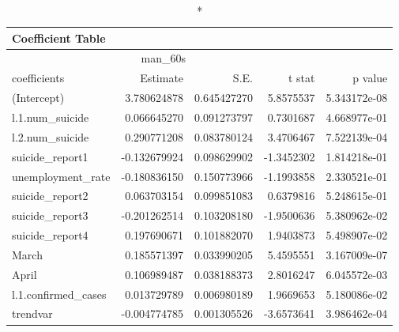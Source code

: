 \begin{longtable}{lrrrr}
\caption*{
{\large Coefficient Table}
} \\ 
\toprule
\multicolumn{4}{c}{man\_60s} &  \\ 
\cmidrule(lr){1-4}
coefficients & Estimate & S.E. & t stat & p value \\ 
\midrule\addlinespace[2.5pt]
(Intercept) & 3.780624878 & 0.645427270 & 5.8575537 & 5.343172e-08 \\ 
l.1.num\_suicide & 0.066645270 & 0.091273797 & 0.7301687 & 4.668977e-01 \\ 
l.2.num\_suicide & 0.290771208 & 0.083780124 & 3.4706467 & 7.522139e-04 \\ 
suicide\_report1 & -0.132679924 & 0.098629902 & -1.3452302 & 1.814218e-01 \\ 
unemployment\_rate & -0.180836150 & 0.150773966 & -1.1993858 & 2.330521e-01 \\ 
suicide\_report2 & 0.063703154 & 0.099851083 & 0.6379816 & 5.248615e-01 \\ 
suicide\_report3 & -0.201262514 & 0.103208180 & -1.9500636 & 5.380962e-02 \\ 
suicide\_report4 & 0.197690671 & 0.101882070 & 1.9403873 & 5.498907e-02 \\ 
March & 0.185571397 & 0.033990205 & 5.4595551 & 3.167009e-07 \\ 
April & 0.106989487 & 0.038188373 & 2.8016247 & 6.045572e-03 \\ 
l.1.confirmed\_cases & 0.013729789 & 0.006980189 & 1.9669653 & 5.180086e-02 \\ 
trendvar & -0.004774785 & 0.001305526 & -3.6573641 & 3.986462e-04 \\ 
\bottomrule
\end{longtable}

